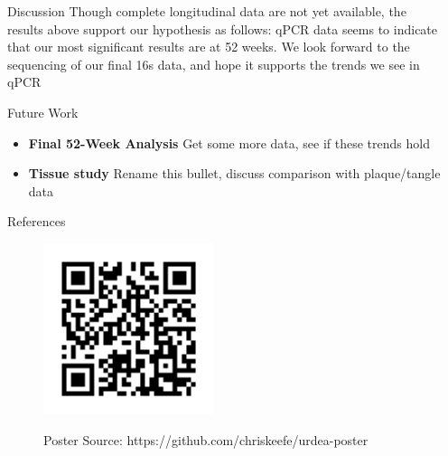 \documentclass[final]{beamer}
\newlength{\sepwidth}
\newlength{\colwidth}
\newcommand{\separatorcolumn}{\begin{column}{\sepwidth}\end{column}}
\begin{document}
\begin{frame}[t]
\begin{columns}[t]
\begin{column}{\colwidth}
\begin{block}{Discussion}
    Though complete longitudinal data are not yet available, the results
    above support our hypothesis as follows: qPCR data seems to indicate that
    our most significant results are at 52 weeks. We look forward to the
    sequencing of our final 16s data, and hope it supports the trends we see in qPCR
  \end{block}

  \begin{block}{Future Work}

    \begin{itemize}
      \item \textbf{Final 52-Week Analysis} Get some more data, see if these trends hold
      \item \textbf{Tissue study} Rename this bullet, discuss comparison with plaque/tangle data
    \end{itemize}

  \end{block}

  \begin{block}{References}

    \nocite{*}
    

  \end{block}

  \begin{figure}
    \begin{minipage}[c]{\textwidth}
      \hfill
      \includegraphics[height=5cm]{assets/repo}
    \end{minipage}
    \begin{minipage}[c]{\textwidth}
      \hfill
      Poster Source: https://github.com/chriskeefe/urdea-poster
    \end{minipage}
\end{figure}


\end{column}

\separatorcolumn
\end{columns}
\end{frame}
\end{document}
